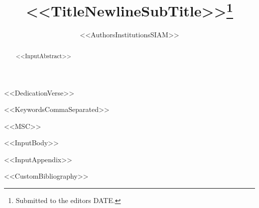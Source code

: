 \documentclass[%
review,
onefignum,
onetabnum,
<<DocumentClassOptions>>]{siamart220329}
\title{<<TitleNewlineSubTitle>>\thanks{Submitted to the editors DATE.\funding{<<Funding>>}}}
\author{%
<<AuthorsInstitutionsSIAM>>
}
\begin{document}
\maketitle

<<DedicationVerse>>

\begin{abstract}
<<InputAbstract>>
\end{abstract}

\begin{keywords}
<<KeywordsCommaSeparated>>
\end{keywords}

\begin{MSCcodes}
<<MSC>>
\end{MSCcodes}

<<InputBody>>

\appendix
<<InputAppendix>>


<<CustomBibliography>>
\end{document}
